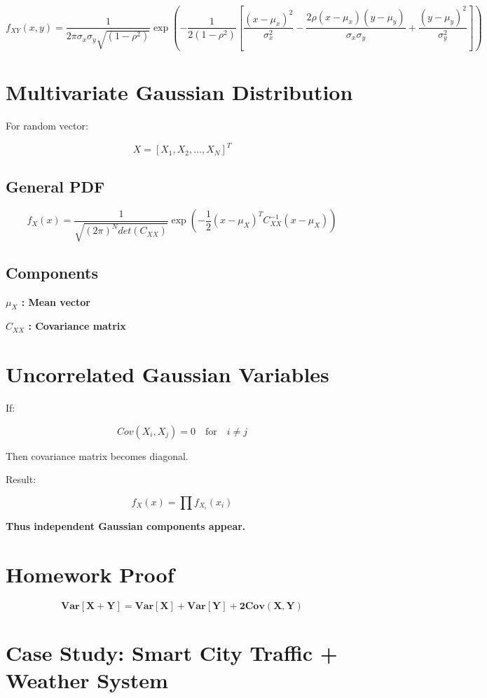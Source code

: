 \documentclass[12pt]{article}
\begin{document}
\[
\boxed{
f_{XY}(x,y) =
\frac{1}{2\pi \sigma_x \sigma_y \sqrt{(1 - \rho^2)}}
\exp\left(
-\frac{1}{2(1-\rho^2)}
\left[
\frac{(x-\mu_x)^2}{\sigma_x^2}
- \frac{2\rho(x-\mu_x)(y-\mu_y)}{\sigma_x\sigma_y}
+ \frac{(y-\mu_y)^2}{\sigma_y^2}
\right]
\right)
}
\]

\section{Multivariate Gaussian Distribution}

For random vector:

\[
X = [X_1, X_2, ..., X_N]^T
\]

\subsection{General PDF}

\[
\boxed{
f_X(x) =
\frac{1}{\sqrt{(2\pi)^N det(C_{XX})}}
\exp\left(
-\frac{1}{2}
(x - \mu_X)^T
C_{XX}^{-1}
(x - \mu_X)
\right)
}
\]

\subsection{Components}

\textbf{$\mu_X$ : Mean vector}

\textbf{$C_{XX}$ : Covariance matrix}

\section{Uncorrelated Gaussian Variables}

If:

\[
Cov(X_i, X_j) = 0 \quad \text{for} \quad i \neq j
\]

Then covariance matrix becomes diagonal.

Result:

\[
\boxed{f_X(x) = \prod f_{X_i}(x_i)}
\]

\textbf{Thus independent Gaussian components appear.}

\section{Homework Proof}

\[
\boxed{\mathbf{Var[X + Y] = Var[X] + Var[Y] + 2Cov(X,Y)}}
\]

\section{Case Study: Smart City Traffic + Weather System}
\end{document}
